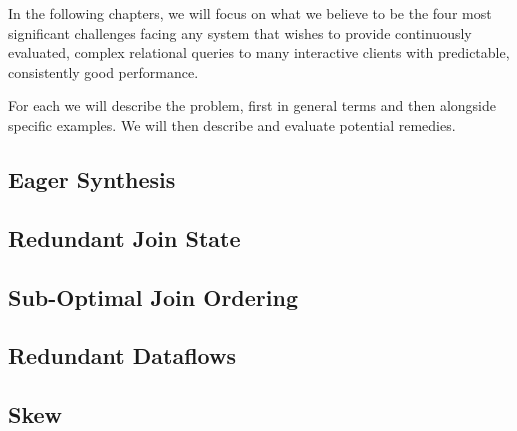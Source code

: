 \documentclass[../index.tex]{subfiles}
\begin{document}
In the following chapters, we will focus on what we believe to be the
four most significant challenges facing any system that wishes to
provide continuously evaluated, complex relational queries to many
interactive clients with predictable, consistently good performance.

For each we will describe the problem, first in general terms and then
alongside specific examples. We will then describe and evaluate
potential remedies.

\subsection{Eager Synthesis} \label{case-eagerness}


\subsection{Redundant Join State} \label{case-join-state}


\subsection{Sub-Optimal Join Ordering} \label{case-join-ordering}


\subsection{Redundant Dataflows} \label{case-redundant-dataflows}


\subsection{Skew} \label{case-skew}
\end{document}
